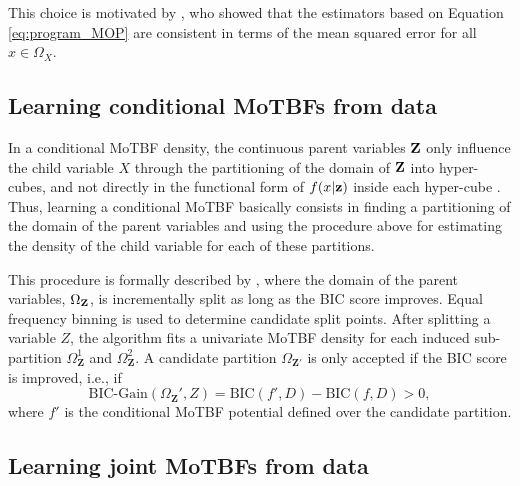 This choice is motivated by \cite{Lan14}, who showed that the estimators based on Equation \ref{eq:program_MOP} are consistent  in terms of the mean squared error for all $x\in \Omega_X$.


\subsection{Learning conditional MoTBFs from data}
\label{sec:learningConditionalMOP}
In a conditional MoTBF density, the continuous parent variables $\mathbf{Z}$ only influence the child variable $X$
through the partitioning of the domain of $\mathbf{Z}$ into hyper-cubes, and not directly in the functional form of $f(x | \mathbf{z})$ inside each
hyper-cube \citep{Lan12}. Thus, learning a conditional MoTBF basically consists in finding a partitioning of the
domain of the parent variables and using the procedure above for estimating the density of the child variable
for each of these partitions.

This procedure is formally described by  \cite{Lan14}, where the domain of the parent variables,
$\Omega_{\mathbf{Z}}$, is incrementally split as long as the BIC score
improves. Equal frequency binning is used to determine candidate split points. After splitting a variable $Z$, 
the algorithm fits a univariate MoTBF density for each induced sub-partition $\Omega_{\boldsymbol{Z}}^{1}$ and
$\Omega_{\boldsymbol{Z}}^{2}$. A candidate partition $\Omega_{\boldsymbol{Z}'}$ is only accepted 
if the BIC score is improved, i.e., if 
\[
\text{BIC-Gain}(\Omega_{\boldsymbol{Z}}',Z) = \text{BIC}(f',D) - \text{BIC}(f,D) > 0,
\]
where $f'$ is the conditional MoTBF potential defined over the candidate partition.




\subsection{Learning joint MoTBFs from data}
\label{sec:learningJointMOP}

